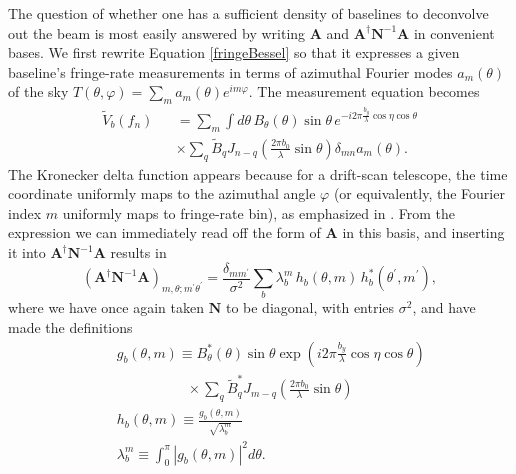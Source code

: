 \documentclass[twocolumn,apj,numberedappendix]{emulateapj}
\newcommand{\A}{\mathbf{A}}
\newcommand{\N}{\mathbf{N}}
\begin{document}
The question of whether one has a sufficient density of baselines to deconvolve
out the beam is most easily answered by writing $\A$ and $\A^\dagger \N^{-1}
\A$ in convenient bases.  We first rewrite Equation \eqref{fringeBessel} so
that it expresses a given baseline's fringe-rate measurements in terms of
azimuthal Fourier modes $a_m(\theta)$ of the sky $T(\theta, \varphi) = \sum_m
a_m(\theta) e^{i m \varphi}$.  The measurement equation becomes
\begin{eqnarray}
\label{eq:convenientBasis}
\widetilde{V}_b (f_n) && = \sum_m \int d\theta \, B_\theta (\theta) \sin \theta  \, e^{-i 2 \pi  \frac{b_y}{\lambda} \cos \eta \cos \theta} \nonumber \\
&& \times \sum_q \widetilde{B}_q  J_{n-q} \left( \frac{2 \pi b_0}{\lambda} \sin \theta \right) \delta_{mn} a_m (\theta).
\end{eqnarray}
The Kronecker delta function appears because for a drift-scan telescope, the
time coordinate uniformly maps to the azimuthal angle $\varphi$ (or
equivalently, the Fourier index $m$ uniformly maps to fringe-rate bin), as
emphasized in \cite{Shaw2013}.  From the expression we can immediately read off
the form of $\A$ in this basis, and inserting it into $\A^\dagger \N^{-1} \A$
results in
\begin{equation}
\label{manifest}
\left( \A^\dagger \N^{-1} \A \right)_{m, \theta ; m^\prime \theta^\prime} = \frac{\delta_{m m^\prime}}{\sigma^2} \sum_b \lambda_b^m \, h_b(\theta, m) \, h_{b}^*(\theta^\prime, m^\prime),
\end{equation}
where we have once again taken $\N$ to be diagonal, with entries $\sigma^2$, and have made the definitions
\begin{eqnarray}
&& g_b(\theta, m) \equiv B_\theta^*(\theta) \sin \theta \exp \left(i 2 \pi  \frac{b_y}{\lambda} \cos \eta \cos \theta\right) \nonumber \\
&& \qquad \qquad \quad \times \sum_q \widetilde{B}^*_q  J_{m-q} \left( \frac{2 \pi b_0}{\lambda} \sin \theta \right) \\
&&  h_b ( \theta, m) \equiv \frac{g_b (\theta, m)}{\sqrt{\lambda_b^m}} \\
&& \lambda_b^m \equiv  \int_0^\pi |g_b (\theta, m) |^2 d\theta .
\end{eqnarray}
\end{document}
